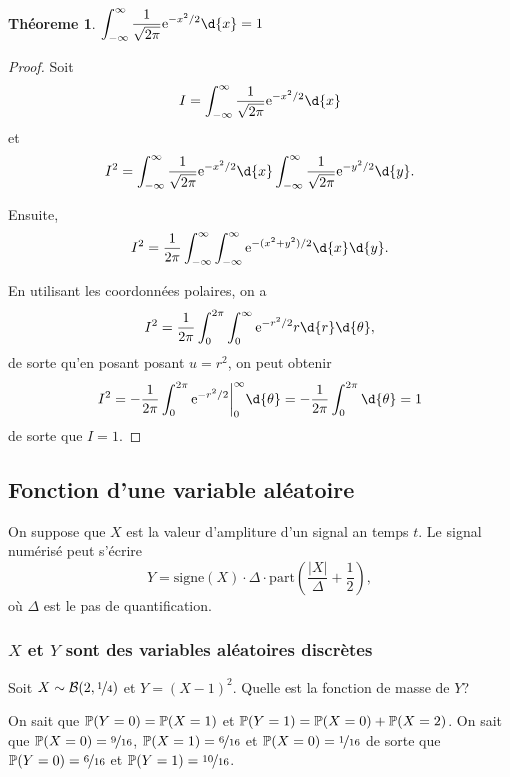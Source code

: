 \documentclass[11pt]{article}
\renewcommand\P{%
	\ensuremath{%
		\mathbb{P}%
	}%
}%
\newcommand\e{%
	\ensuremath{%
		\mathrm{e}%
	}%
}%
\newcommand\bin{%
	\ensuremath{%
		\mathcal{B}%
	}%
}%
\newtheorem{theoreme}{Théoreme}[section]
\begin{document}
\begin{theoreme}
	$\displaystyle\int_{-\infty}^\infty
	\frac{1}{\sqrt{2\pi}}\e^{-x^2/2}\d{x}=1$
\end{theoreme}

\begin{proof}
	Soit
	\begin{equation*}
		I=\int_{-\infty}^\infty\frac{1}{\sqrt{2\pi}}\e^{-x^2/2}\d{x}
	\end{equation*}
	et
	\begin{equation*}
		I^2=
			\int_{-\infty}^\infty\frac{1}{\sqrt{2\pi}}\e^{-x^2/2}\d{x}
			\int_{-\infty}^\infty\frac{1}{\sqrt{2\pi}}\e^{-y^2/2}\d{y}.
	\end{equation*}

	Ensuite,
	\begin{equation*}
		I^2=\frac{1}{2\pi}\int_{-\infty}^\infty\int_{-\infty}^\infty
			\e^{-(x^2+y^2)/2}\d{x}\d{y}.
	\end{equation*}

	En utilisant les coordonnées polaires, on a
	\begin{equation*}
		I^2=\frac{1}{2\pi}\int_0^{2\pi}\int_0^\infty
			\e^{-r^2/2}r\d{r}\d{\theta},
	\end{equation*}
	de sorte qu'en posant posant $u=r^2$, on peut obtenir
	\begin{equation*}
		I^2=-\frac{1}{2\pi}\int_0^{2\pi}
			\e^{-r^2/2}\bigg\rvert_0^\infty\d{\theta}=
		-\frac{1}{2\pi}\int_0^{2\pi}\d{\theta}=1
	\end{equation*}
	de sorte que $I=1$.
\end{proof}

\subsection{Fonction d'une variable aléatoire}
\begin{exemple}
	On suppose que $X$ est la valeur d'ampliture d'un signal an temps $t$. Le
	signal numérisé peut s'écrire
	\begin{equation*}
		Y=\mathrm{signe}(X)\cdot\Delta\cdot\mathrm{part}\left(
			\frac{|X|}{\Delta}+\frac{1}{2}
		\right),
	\end{equation*}
	où $\Delta$ est le pas de quantification.
\end{exemple}

\subsubsection{$X$ et $Y$ sont des variables aléatoires discrètes}
%
%
\begin{exemple}
	Soit $X\sim\bin(2,\nicefrac{1}{4})$ et $Y=(X-1)^2$. Quelle est la fonction
	de masse de $Y$?

	On sait que $\P(Y=0)=\P(X=1)$ et $\P(Y=1)=\P(X=0)+\P(X=2)$. On sait que
	$\P(X=0)=\nicefrac{9}{16}$, $\P(X=1)=\nicefrac{6}{16}$ et $\P(X=0)=
	\nicefrac{1}{16}$ de sorte que $\P(Y=0)=\nicefrac{6}{16}$ et
	$\P(Y=1)=\nicefrac{10}{16}$.
\end{exemple}
\end{document}
